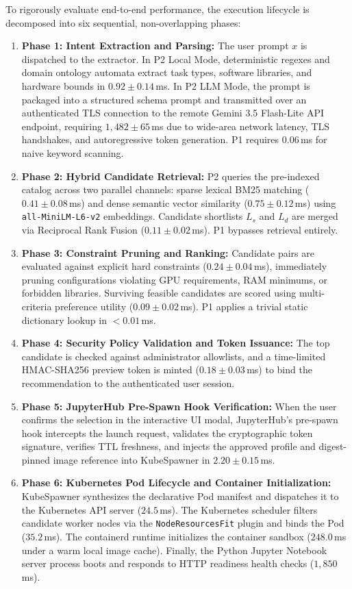 To rigorously evaluate end-to-end performance, the execution lifecycle is decomposed into six sequential, non-overlapping phases:
\begin{enumerate}
    \item \textbf{Phase 1: Intent Extraction and Parsing:} The user prompt $x$ is dispatched to the extractor. In P2 Local Mode, deterministic regexes and domain ontology automata extract task types, software libraries, and hardware bounds in $0.92 \pm 0.14$\,ms. In P2 LLM Mode, the prompt is packaged into a structured schema prompt and transmitted over an authenticated TLS connection to the remote Gemini 3.5 Flash-Lite API endpoint, requiring $1,482 \pm 65$\,ms due to wide-area network latency, TLS handshakes, and autoregressive token generation. P1 requires $0.06$\,ms for naive keyword scanning.
    \item \textbf{Phase 2: Hybrid Candidate Retrieval:} P2 queries the pre-indexed catalog across two parallel channels: sparse lexical BM25 matching ($0.41 \pm 0.08$\,ms) and dense semantic vector similarity ($0.75 \pm 0.12$\,ms) using \texttt{all-MiniLM-L6-v2} embeddings. Candidate shortlists $L_s$ and $L_d$ are merged via Reciprocal Rank Fusion ($0.11 \pm 0.02$\,ms). P1 bypasses retrieval entirely.
    \item \textbf{Phase 3: Constraint Pruning and Ranking:} Candidate pairs are evaluated against explicit hard constraints ($0.24 \pm 0.04$\,ms), immediately pruning configurations violating GPU requirements, RAM minimums, or forbidden libraries. Surviving feasible candidates are scored using multi-criteria preference utility ($0.09 \pm 0.02$\,ms). P1 applies a trivial static dictionary lookup in $<0.01$\,ms.
    \item \textbf{Phase 4: Security Policy Validation and Token Issuance:} The top candidate is checked against administrator allowlists, and a time-limited HMAC-SHA256 preview token is minted ($0.18 \pm 0.03$\,ms) to bind the recommendation to the authenticated user session.
    \item \textbf{Phase 5: JupyterHub Pre-Spawn Hook Verification:} When the user confirms the selection in the interactive UI modal, JupyterHub's pre-spawn hook intercepts the launch request, validates the cryptographic token signature, verifies TTL freshness, and injects the approved profile and digest-pinned image reference into KubeSpawner in $2.20 \pm 0.15$\,ms.
    \item \textbf{Phase 6: Kubernetes Pod Lifecycle and Container Initialization:} KubeSpawner synthesizes the declarative Pod manifest and dispatches it to the Kubernetes API server ($24.5$\,ms). The Kubernetes scheduler filters candidate worker nodes via the \texttt{NodeResourcesFit} plugin and binds the Pod ($35.2$\,ms). The containerd runtime initializes the container sandbox ($248.0$\,ms under a warm local image cache). Finally, the Python Jupyter Notebook server process boots and responds to HTTP readiness health checks ($1,850$\,ms).
\end{enumerate}

